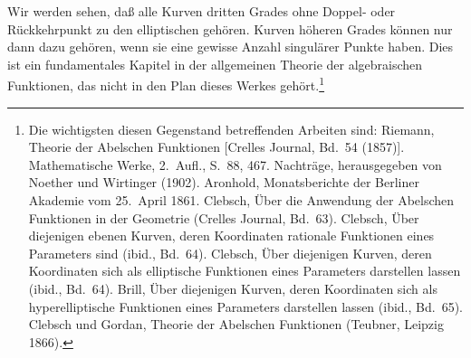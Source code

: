 \documentclass[11pt]{article}
\begin{document}
Wir werden sehen, daß alle Kurven dritten Grades ohne Doppel- oder Rückkehrpunkt zu den elliptischen gehören. Kurven höheren Grades können nur dann dazu gehören, wenn sie eine gewisse Anzahl singulärer Punkte haben. Dies ist ein fundamentales Kapitel in der allgemeinen Theorie der algebraischen Funktionen, das nicht in den Plan dieses Werkes gehört.\footnote{Die wichtigsten diesen Gegenstand betreffenden Arbeiten sind: Riemann, Theorie der Abelschen Funktionen [Crelles Journal, Bd.~54 (1857)]. Mathematische Werke, 2.~Aufl., S.~88, 467. Nachträge, herausgegeben von Noether und Wirtinger (1902). Aronhold, Monatsberichte der Berliner Akademie vom 25.~April 1861. Clebsch, Über die Anwendung der Abelschen Funktionen in der Geometrie (Crelles Journal, Bd.~63). Clebsch, Über diejenigen ebenen Kurven, deren Koordinaten rationale Funktionen eines Parameters sind (ibid., Bd.~64). Clebsch, Über diejenigen Kurven, deren Koordinaten sich als elliptische Funktionen eines Parameters darstellen lassen (ibid., Bd.~64). Brill, Über diejenigen Kurven, deren Koordinaten sich als hyperelliptische Funktionen eines Parameters darstellen lassen (ibid., Bd.~65). Clebsch und Gordan, Theorie der Abelschen Funktionen (Teubner, Leipzig 1866).}
\end{document}
